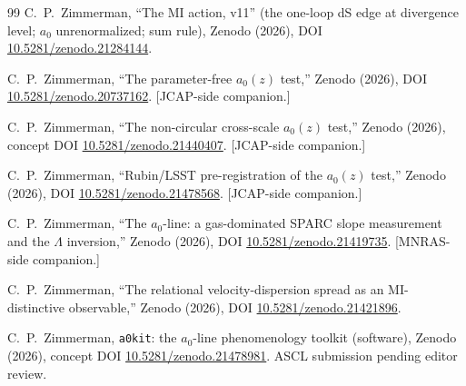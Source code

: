 \documentclass[11pt]{article}
\begin{document}
\begin{thebibliography}{99}
 C.\ P.\ Zimmerman, ``The MI action, v11'' (the one-loop dS edge at divergence level; $a_0$ unrenormalized; sum rule), Zenodo (2026), DOI \href{https://doi.org/10.5281/zenodo.21284144}{10.5281/zenodo.21284144}.

 C.\ P.\ Zimmerman, ``The parameter-free $a_0(z)$ test,'' Zenodo (2026), DOI \href{https://doi.org/10.5281/zenodo.20737162}{10.5281/zenodo.20737162}. [JCAP-side companion.]

 C.\ P.\ Zimmerman, ``The non-circular cross-scale $a_0(z)$ test,'' Zenodo (2026), concept DOI \href{https://doi.org/10.5281/zenodo.21440407}{10.5281/zenodo.21440407}. [JCAP-side companion.]

 C.\ P.\ Zimmerman, ``Rubin/LSST pre-registration of the $a_0(z)$ test,'' Zenodo (2026), DOI \href{https://doi.org/10.5281/zenodo.21478568}{10.5281/zenodo.21478568}. [JCAP-side companion.]

 C.\ P.\ Zimmerman, ``The $a_0$-line: a gas-dominated SPARC slope measurement and the $\Lambda$ inversion,'' Zenodo (2026), DOI \href{https://doi.org/10.5281/zenodo.21419735}{10.5281/zenodo.21419735}. [MNRAS-side companion.]

 C.\ P.\ Zimmerman, ``The relational velocity-dispersion spread as an MI-distinctive observable,'' Zenodo (2026), DOI \href{https://doi.org/10.5281/zenodo.21421896}{10.5281/zenodo.21421896}.

 C.\ P.\ Zimmerman, \texttt{a0kit}: the $a_0$-line phenomenology toolkit (software), Zenodo (2026), concept DOI \href{https://doi.org/10.5281/zenodo.21478981}{10.5281/zenodo.21478981}. ASCL submission pending editor review.

\end{thebibliography}
\end{document}
